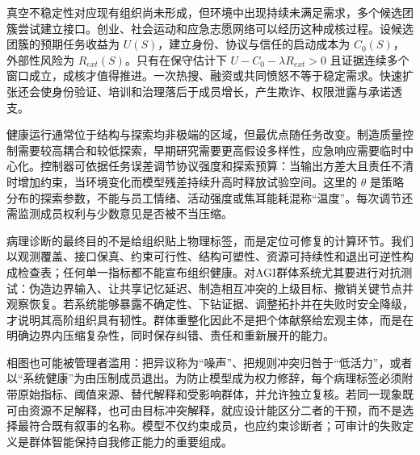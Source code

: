 真空不稳定性对应现有组织尚未形成，但环境中出现持续未满足需求，多个候选团簇尝试建立接口。创业、社会运动和应急志愿网络可以经历这种成核过程。设候选团簇的预期任务收益为 $U(S)$，建立身份、协议与信任的启动成本为 $C_0(S)$，外部性风险为 $R_{ext}(S)$。只有在保守估计下 $U-C_0-\lambda R_{ext}>0$ 且证据连续多个窗口成立，成核才值得推进。一次热搜、融资或共同愤怒不等于稳定需求。快速扩张还会使身份验证、培训和治理落后于成员增长，产生欺诈、权限泄露与承诺透支。

健康运行通常位于结构与探索均非极端的区域，但最优点随任务改变。制造质量控制需要较高耦合和较低探索，早期研究需要更高假设多样性，应急响应需要临时中心化。控制器可依据任务误差调节协议强度和探索预算：当输出方差大且责任不清时增加约束，当环境变化而模型残差持续升高时释放试验空间。这里的 $\theta$ 是策略分布的探索参数，不能与员工情绪、活动强度或焦耳能耗混称“温度”。每次调节还需监测成员权利与少数意见是否被不当压缩。

病理诊断的最终目的不是给组织贴上物理标签，而是定位可修复的计算环节。我们以观测覆盖、接口保真、约束可行性、结构可塑性、资源可持续性和退出可逆性构成检查表；任何单一指标都不能宣布组织健康。对AGI群体系统尤其要进行对抗测试：伪造边界输入、让共享记忆延迟、制造相互冲突的上级目标、撤销关键节点并观察恢复。若系统能够暴露不确定性、下钻证据、调整拓扑并在失败时安全降级，才说明其高阶组织具有韧性。群体重整化因此不是把个体献祭给宏观主体，而是在明确边界内压缩复杂性，同时保存纠错、责任和重新展开的能力。

相图也可能被管理者滥用：把异议称为“噪声”、把规则冲突归咎于“低活力”，或者以“系统健康”为由压制成员退出。为防止模型成为权力修辞，每个病理标签必须附带原始指标、阈值来源、替代解释和受影响群体，并允许独立复核。若同一现象既可由资源不足解释，也可由目标冲突解释，就应设计能区分二者的干预，而不是选择最符合既有叙事的名称。模型不仅约束成员，也应约束诊断者；可审计的失败定义是群体智能保持自我修正能力的重要组成。


